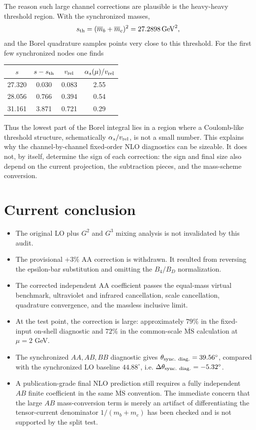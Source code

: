 \documentclass[11pt]{article}
\newcommand{\as}{\alpha_s}
\newcommand{\MSbar}{\overline{\mathrm{MS}}}
\begin{document}
The reason such large channel corrections are plausible is the heavy-heavy
threshold region.  With the synchronized masses,
\begin{equation}
 s_{\rm th}=(\overline m_b+\overline m_c)^2=27.2898\,{\rm GeV}^2 ,
\end{equation}
and the Borel quadrature samples points very close to this threshold.  For
the first few synchronized nodes one finds
\begin{center}
\begin{tabular}{cccc}
\toprule
\(s\) & \(s-s_{\rm th}\) & \(v_{\rm rel}\) & \(\as(\mu)/v_{\rm rel}\)\\
\midrule
27.320 & 0.030 & 0.083 & 2.55\\
28.056 & 0.766 & 0.394 & 0.54\\
31.161 & 3.871 & 0.721 & 0.29\\
\bottomrule
\end{tabular}
\end{center}
Thus the lowest part of the Borel integral lies in a region where a
Coulomb-like threshold structure, schematically \(\as/v_{\rm rel}\), is not
a small number.  This explains why the channel-by-channel fixed-order NLO
diagnostics can be sizeable.  It does not, by itself, determine the sign of
each correction: the sign and final size also depend on the current
projection, the subtraction pieces, and the mass-scheme conversion.

\section{Current conclusion}

\begin{itemize}
 \item The original LO plus \(G^2\) and \(G^3\) mixing analysis is not
 invalidated by this audit.
 \item The provisional \(+3\%\) AA correction is withdrawn.  It resulted
 from reversing the epsilon-bar substitution and omitting the
 \(B_4/B_D\) normalization.
 \item The corrected independent AA coefficient passes the equal-mass
 virtual benchmark, ultraviolet and infrared cancellation, scale
 cancellation, quadrature convergence, and the massless inclusive limit.
 \item At the test point, the correction is large: approximately \(79\%\)
 in the fixed-input on-shell diagnostic and \(72\%\) in the common-scale
 \(\MSbar\) calculation at \(\mu=2\) GeV.
 \item The synchronized \(AA,AB,BB\) diagnostic gives
 \(\theta_{\rm sync.\ diag.}=39.56^\circ\), compared with the synchronized
 LO baseline \(44.88^\circ\), i.e.
 \(\Delta\theta_{\rm sync.\ diag.}=-5.32^\circ\).
 \item A publication-grade final NLO prediction still requires a fully
 independent \(AB\) finite coefficient in the same \(\MSbar\) convention.
 The immediate concern that the large \(AB\) mass-conversion term is merely
 an artifact of differentiating the tensor-current denominator
 \(1/(m_b+m_c)\) has been checked and is not supported by the split test.
\end{itemize}
\end{document}
